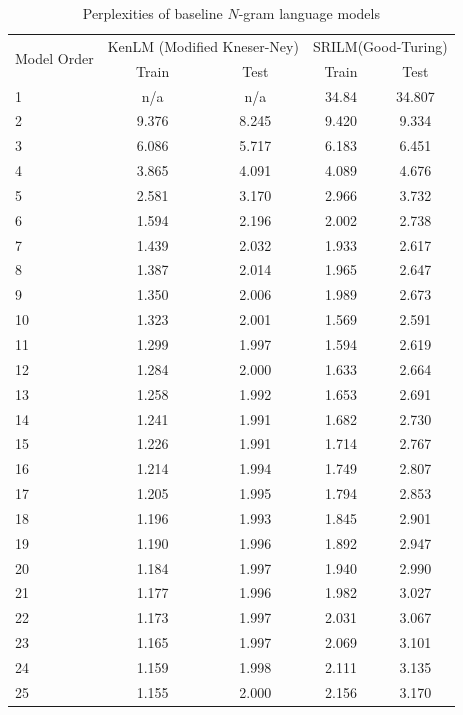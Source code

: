 \begin{table}[p]
  \centering
  \caption{Perplexities of baseline $N$-gram language models}
  \label{tab:baseline-perplexity}
\begin{tabular}{l c c c c}
  \toprule
  \multirow{2}{*}{Model Order} & \multicolumn{2}{c}{KenLM (Modified Kneser-Ney)} & \multicolumn{2}{c}{SRILM(Good-Turing)} \\
  \cmidrule{2-3}
  & Train & Test & Train & Test\\
  \midrule
1  & n/a   & n/a   & 34.84 & 34.807\\
2  & 9.376 & 8.245 & 9.420 & 9.334 \\
3  & 6.086 & 5.717 & 6.183 & 6.451 \\
4  & 3.865 & 4.091 & 4.089 & 4.676 \\
5  & 2.581 & 3.170 & 2.966 & 3.732 \\
6  & 1.594 & 2.196 & 2.002 & 2.738 \\
7  & 1.439 & 2.032 & 1.933 & 2.617 \\
8  & 1.387 & 2.014 & 1.965 & 2.647 \\
9  & 1.350 & 2.006 & 1.989 & 2.673 \\
10 & 1.323 & 2.001 & 1.569 & 2.591 \\
11 & 1.299 & 1.997 & 1.594 & 2.619 \\
12 & 1.284 & 2.000 & 1.633 & 2.664 \\
13 & 1.258 & 1.992 & 1.653 & 2.691 \\
14 & 1.241 & 1.991 & 1.682 & 2.730 \\
15 & 1.226 & 1.991 & 1.714 & 2.767 \\
16 & 1.214 & 1.994 & 1.749 & 2.807 \\
17 & 1.205 & 1.995 & 1.794 & 2.853 \\
18 & 1.196 & 1.993 & 1.845 & 2.901 \\
19 & 1.190 & 1.996 & 1.892 & 2.947 \\
20 & 1.184 & 1.997 & 1.940 & 2.990 \\
21 & 1.177 & 1.996 & 1.982 & 3.027 \\
22 & 1.173 & 1.997 & 2.031 & 3.067 \\
23 & 1.165 & 1.997 & 2.069 & 3.101 \\
24 & 1.159 & 1.998 & 2.111 & 3.135 \\
25 & 1.155 & 2.000 & 2.156 & 3.170 \\
  \bottomrule
\end{tabular}
\end{table}

